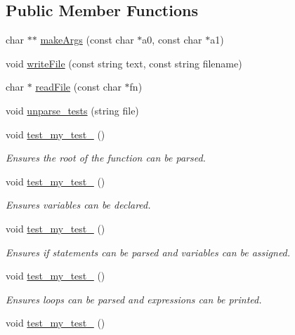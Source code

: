 \subsection*{Public Member Functions}
\begin{DoxyCompactItemize}
\item 
char $\ast$$\ast$ \hyperlink{classAstTestSuite_a2f0462e7a965acda10e09e70432cab40}{make\-Args} (const char $\ast$a0, const char $\ast$a1)
\item 
void \hyperlink{classAstTestSuite_ab935b3c95647b24b5f250b7e3332a313}{write\-File} (const string text, const string filename)
\item 
char $\ast$ \hyperlink{classAstTestSuite_afb1462e2494b011f0e5077a567e0ba3d}{read\-File} (const char $\ast$fn)
\item 
void \hyperlink{classAstTestSuite_a1fb6dcbf82548632381eb89079b456aa}{unparse\-\_\-tests} (string file)
\item 
void \hyperlink{classAstTestSuite_a4cbddb78a689baf1b27a2a49a0865518}{test\-\_\-my\-\_\-test\-\_} ()
\begin{DoxyCompactList}\small\item\em Ensures the root of the function can be parsed. \end{DoxyCompactList}\item 
void \hyperlink{classAstTestSuite_ac7d9c4949e470d827005c1ead8ea124e}{test\-\_\-my\-\_\-test\-\_} ()
\begin{DoxyCompactList}\small\item\em Ensures variables can be declared. \end{DoxyCompactList}\item 
void \hyperlink{classAstTestSuite_a0e62549846c7bf5fec73a3e905489dd3}{test\-\_\-my\-\_\-test\-\_} ()
\begin{DoxyCompactList}\small\item\em Ensures if statements can be parsed and variables can be assigned. \end{DoxyCompactList}\item 
void \hyperlink{classAstTestSuite_aecae8b1ee68f7d09ae460b88db03bc40}{test\-\_\-my\-\_\-test\-\_} ()
\begin{DoxyCompactList}\small\item\em Ensures loops can be parsed and expressions can be printed. \end{DoxyCompactList}\item 
void \hyperlink{classAstTestSuite_a9d44a169841879efae1412b4a59feee5}{test\-\_\-my\-\_\-test\-\_} ()
$$
\end{DoxyCompactItemize}
